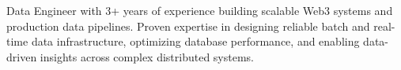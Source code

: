 \documentclass[letter,10pt]{article}
\begin{document}
Data Engineer with 3+ years of experience building scalable Web3 systems and production data pipelines. Proven expertise in designing reliable batch and real-time data infrastructure, optimizing database performance, and enabling data-driven insights across complex distributed systems.
\end{document}
